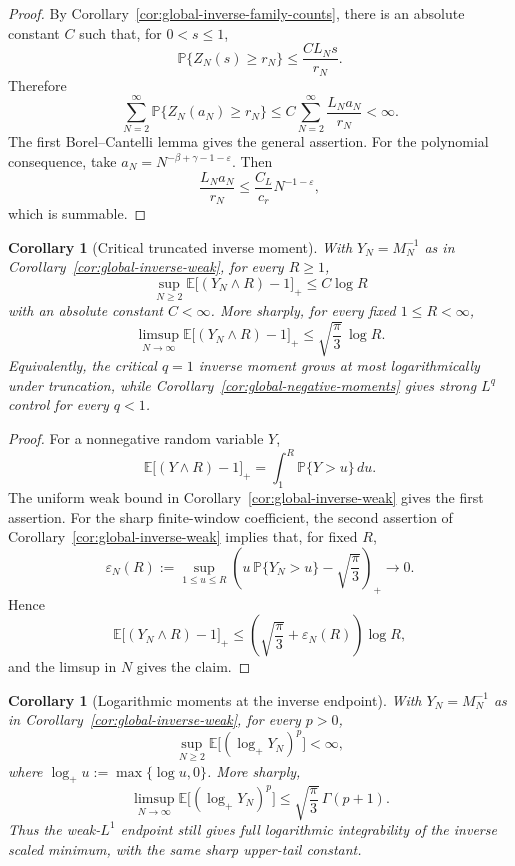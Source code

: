 \documentclass[11pt]{amsart}
\numberwithin{equation}{section}
\newtheorem{corollary}[theorem]{Corollary}
\theoremstyle{definition}
\theoremstyle{remark}
\newcommand{\Prob}{\mathbb P}
\newcommand{\Exp}{\mathbb E}
\newcommand{\eps}{\varepsilon}
\begin{document}
\begin{proof}
By Corollary~\ref{cor:global-inverse-family-counts}, there is an absolute
constant \(C\) such that, for \(0<s\le1\),
\[
  \Prob\{Z_N(s)\ge r_N\}\le \frac{CL_Ns}{r_N}.
\]
Therefore
\[
  \sum_{N=2}^\infty \Prob\{Z_N(a_N)\ge r_N\}
  \le
  C\sum_{N=2}^\infty \frac{L_Na_N}{r_N}
  <\infty .
\]
The first Borel--Cantelli lemma gives the general assertion.  For the
polynomial consequence, take
\(a_N=N^{-\beta+\gamma-1-\eps}\).  Then
\[
  \frac{L_Na_N}{r_N}
  \le \frac{C_L}{c_r}N^{-1-\eps},
\]
which is summable.
\end{proof}

\begin{corollary}[Critical truncated inverse moment]
\label{cor:global-inverse-truncated}
With \(Y_N=M_N^{-1}\) as in Corollary~\ref{cor:global-inverse-weak}, for every
\(R\ge1\),
\[
  \sup_{N\ge2}\Exp\bigl[(Y_N\wedge R)-1\bigr]_+
  \le C\log R
\]
with an absolute constant \(C<\infty\).  More sharply, for every fixed
\(1\le R<\infty\),
\[
  \limsup_{N\to\infty}
  \Exp\bigl[(Y_N\wedge R)-1\bigr]_+
  \le \sqrt{\frac{\pi}{3}}\,\log R .
\]
Equivalently, the critical \(q=1\) inverse moment grows at most logarithmically
under truncation, while Corollary~\ref{cor:global-negative-moments} gives strong
\(L^q\) control for every \(q<1\).
\end{corollary}

\begin{proof}
For a nonnegative random variable \(Y\),
\[
  \Exp\bigl[(Y\wedge R)-1\bigr]_+
  =\int_1^R \Prob\{Y>u\}\,du .
\]
The uniform weak bound in Corollary~\ref{cor:global-inverse-weak} gives the
first assertion.  For the sharp finite-window coefficient, the second assertion
of Corollary~\ref{cor:global-inverse-weak} implies that, for fixed \(R\),
\[
  \varepsilon_N(R):=
  \sup_{1\le u\le R}
  \left(
    u\,\Prob\{Y_N>u\}-\sqrt{\frac{\pi}{3}}
  \right)_+
  \longrightarrow0 .
\]
Hence
\[
  \Exp\bigl[(Y_N\wedge R)-1\bigr]_+
  \le
  \left(\sqrt{\frac{\pi}{3}}+\varepsilon_N(R)\right)\log R,
\]
and the limsup in \(N\) gives the claim.
\end{proof}

\begin{corollary}[Logarithmic moments at the inverse endpoint]
\label{cor:global-inverse-logmoments}
With \(Y_N=M_N^{-1}\) as in Corollary~\ref{cor:global-inverse-weak}, for every
\(p>0\),
\[
  \sup_{N\ge2}\Exp\bigl[(\log_+Y_N)^p\bigr]<\infty ,
\]
where \(\log_+u:=\max\{\log u,0\}\).  More sharply,
\[
  \limsup_{N\to\infty}\Exp\bigl[(\log_+Y_N)^p\bigr]
  \le \sqrt{\frac{\pi}{3}}\,\Gamma(p+1).
\]
Thus the weak-\(L^1\) endpoint still gives full logarithmic integrability of
the inverse scaled minimum, with the same sharp upper-tail constant.
\end{corollary}
\end{document}
